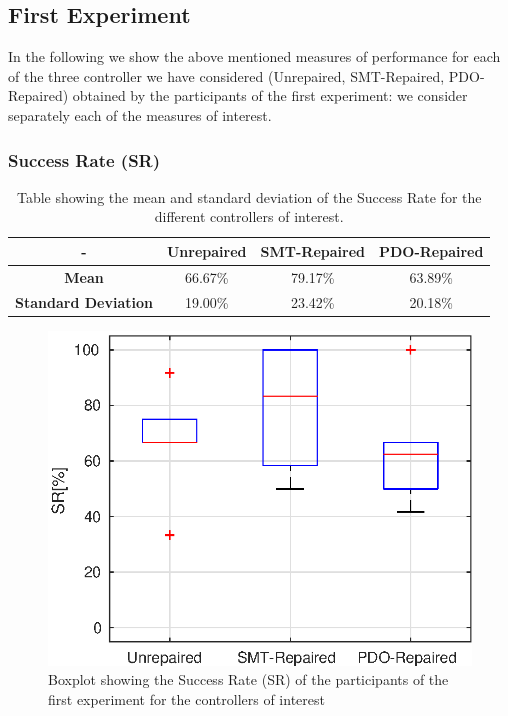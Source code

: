 \subsection{First Experiment}\label{subsec:first-exp}
In the following we show the above mentioned measures of performance for each of the three controller we have considered (Unrepaired, SMT-Repaired, PDO-Repaired) obtained by the participants of the first experiment: we consider separately each of the measures of interest.
\subsubsection{Success Rate (SR)}\label{subsub:first-SR}
\begin{table}[ht]
    \centering
    \begin{tabular}{|c|c|c|c|}
        \hline
        - & \textbf{Unrepaired} & \textbf{SMT-Repaired} & \textbf{PDO-Repaired} \\
        \hline
        \textbf{Mean} & 66.67\% & 79.17\% & 63.89\% \\
        \textbf{Standard Deviation} & 19.00\% & 23.42\% & 20.18\% \\
        \hline
    \end{tabular}
    \caption{Table showing the mean and standard deviation of the Success Rate for the different controllers of interest.}
    \label{tab:SR-first-mean-std}
\end{table}
\begin{figure}[ht]
    \centering
    \includegraphics[width=\textwidth]{Images/first-experiment/exp0_success_rate}
    \caption{Boxplot showing the Success Rate (SR) of the participants of the first experiment for the controllers of interest}
    \label{fig:box-SR-first}
\end{figure}
